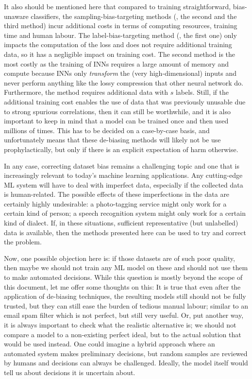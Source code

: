 It also should be mentioned here that compared to training straightforward, bias-unaware classifiers,
the sampling-bias-targeting methods (\ie, the second and the third method)
incur additional costs in terms of computing resources, training time and human labour.
The label-bias-targeting method (\ie, the first one) only impacts the computation of the loss
and does not require additional training data,
so it has a negligible impact on training cost.
The second method is the most costly
as the training of \acp{INN} requires a large amount of memory and compute
because \acp{INN} only \emph{transform} the (very high-dimensional) inputs
and never perform anything like the lossy compression that other neural network do.
Furthermore, the method requires additional data with \(s\) labels.
Still, if the additional training cost enables the use of data
that was previously unusable due to strong spurious correlations,
then it can still be worthwhile,
and it is also important to keep in mind that a model can be trained once
and then used millions of times.
This has to be decided on a case-by-case basis,
and unfortunately means that these de-biasing methods will likely not be use prophylactically,
but only if there is an explicit expectation of harm otherwise.

In any case, correcting dataset bias remains a challenging topic
and one that is increasingly relevant to today's machine learning applications.
Any cutting-edge \ac{ML} system will have to deal with imperfect data,
especially if the collected data is human-related.
The possible effects of these imperfections in the data are certainly highly undesirable:
a photo-tagging service might only work for a certain kind of person;
a speech recognition system might only work for a certain kind of dialect.
If, in these situations, sufficient representative (but unlabelled) data is available,
then the methods presented here can be used to try and correct the problem.

Now, one possible objection here is:
if those datasets are of such poor quality,
then maybe we should not train any \ac{ML} model on these and should not use them to make automated decisions.
While this question is mostly beyond the scope of this document, let me offer some thoughts on this:
It is true that even after the application of de-biasing techniques,
the resulting models still should not be fully trusted,
but they can still ease the burden of tedious manual labour;
similar to an email spam filter which is not perfect, but still very useful.
Or, put another way, it is always important to check what the realistic alternative is;
we should not compare a model to a non-existing perfect ideal, but to the actual solution that would be used instead.
One could imagine a hybrid approach where an automated system makes preliminary decisions,
but random samples are reviewed by humans and decisions can always be challenged.
Ideally, the model itself would tell us about decisions it is uncertain about.

